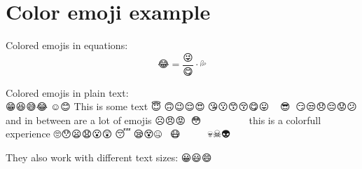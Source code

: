 \documentclass[a5paper,11pt]{article}
\begin{document}
\section*{Color emoji example}


Colored emojis in equations:\\
\begin{equation*}
	😂 = \frac{😜}{😋} \cdot 💦
\end{equation*}

Colored emojis in plain text:\\
😁😆😅😂🤣☺😊 This is some text 😇🙂🙃😉😌😍🥰😘😗😙😚😋😛🤪🤨🧐🤓😎🤩🥳😏😒😞😔😟😕 and in between are a lot of emojis ☹😠😡🤬🤯😳 🥵🥶😱😨😰😥🤗🤔🤭🤫🤥😶😐😑😬 this is a colorfull experience 🙄😯😦😧😮😲🥱😴🤤😪😵🤐🥴🤢🤧😷🤒🤕🤑🤠👿👹👺🤡💩👻💀☠👽👾🤖🎃😺😸😹😻😼😽🙀

They also work with different text sizes: \Huge{😀😃😄}
\end{document}
